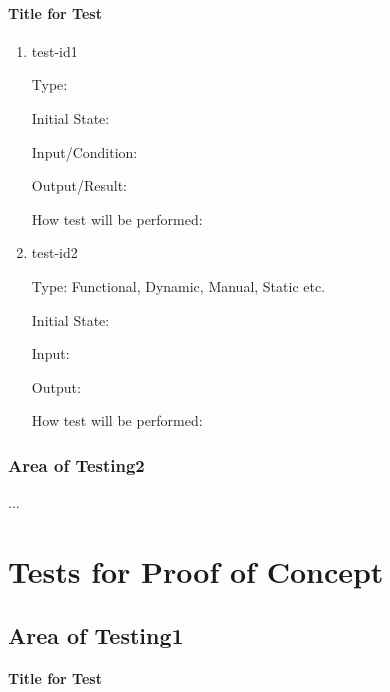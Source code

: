\documentclass[12pt, titlepage]{article}
\begin{document}
\paragraph{Title for Test}

\begin{enumerate}

\item{test-id1\\}

Type: 
					
Initial State: 
					
Input/Condition: 
					
Output/Result: 
					
How test will be performed: 
					
\item{test-id2\\}

Type: Functional, Dynamic, Manual, Static etc.
					
Initial State: 
					
Input: 
					
Output: 
					
How test will be performed: 

\end{enumerate}

\subsubsection{Area of Testing2}

...

\section{Tests for Proof of Concept}

\subsection{Area of Testing1}
		
\paragraph{Title for Test}
\end{document}
